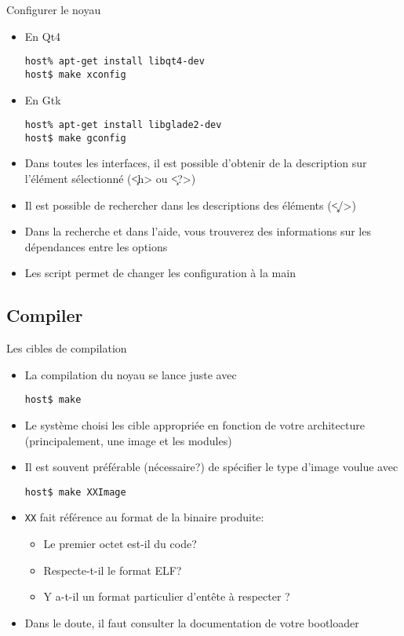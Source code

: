 \begin{frame}[fragile=singleslide]{Configurer le noyau}
\begin{itemize} 
 \item En Qt4
   \begin{lstlisting}
host% apt-get install libqt4-dev
host$ make xconfig
   \end{lstlisting} %
 \item En Gtk
   \begin{lstlisting}
host% apt-get install libglade2-dev
host$ make gconfig
   \end{lstlisting} %
 \item Dans  toutes les  interfaces, il est  possible d'obtenir  de la
   description sur l'élément sélectionné (\c{<h>} ou \c{<?>})
 \item  Il  est  possible  de  rechercher dans  les  descriptions  des
   éléments (\c{</>})
 \item  Dans   la  recherche  et  dans  l'aide,   vous  trouverez  des
   informations sur les dépendances entre les options
 \item   Les  script     permet  de   changer  les
   configuration à la main
 \end{itemize}
\end{frame}

\subsection{Compiler}
\begin{frame}[fragile=singleslide]{Les cibles de compilation}
  \begin{itemize} 
  \item  La compilation  du noyau  se lance  juste avec 
    \begin{lstlisting} 
host$ make
    \end{lstlisting} 
  \item Le  système choisi les  cible appropriée en fonction  de votre
    architecture (principalement, une image et les modules)
   \item Il est souvent  préférable (nécessaire?) de spécifier le type
     d'image voulue avec
    \begin{lstlisting}
host$ make XXImage
    \end{lstlisting}
  \item \verb+XX+ fait référence au format de la binaire produite:
    \begin{itemize}
    \item Le premier octet est-il du code?
    \item Respecte-t-il le format ELF?
    \item Y a-t-il un format particulier d'entête à respecter ?
    \end{itemize}
  \item Dans  le doute,  il faut consulter  la documentation  de votre
    bootloader
  \end{itemize}
\end{frame} 

